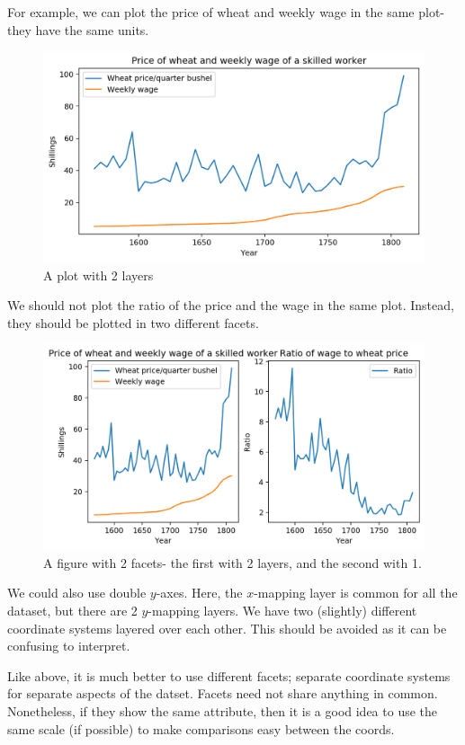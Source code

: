 \documentclass[a4paper, openany]{memoir}
\begin{document}
For example, we can plot the price of wheat and weekly wage in the same plot- they have the same units.
\begin{figure}[H]
    \centering
    \includegraphics[scale=0.5]{src/2.59 layered components.png}
    \caption{A plot with 2 layers}
\end{figure}
\noindent We should not plot the ratio of the price and the wage in the same plot. Instead, they should be plotted in two different facets.
\begin{figure}[H]
    \centering
    \includegraphics[scale=0.6]{src/2.61 wheat example II.png}
    \caption{A figure with 2 facets- the first with 2 layers, and the second with 1.}    
\end{figure}
We could also use double $y$-axes. Here, the $x$-mapping layer is common for all the dataset, but there are 2 $y$-mapping layers. We have two (slightly) different coordinate systems layered over each other. This should be avoided as it can be confusing to interpret.

Like above, it is much better to use different facets; separate coordinate systems for separate aspects of the datset. Facets need not share anything in common. Nonetheless, if they show the same attribute, then it is a good idea to use the same scale (if possible) to make comparisons easy between the coords.
\end{document}
